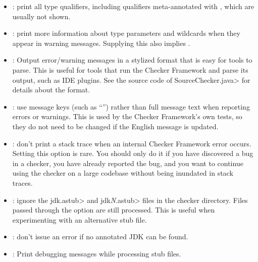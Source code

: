 \begin{itemize}
\item {}: print all type qualifiers, including
qualifiers meta-annotated with , which are
usually not shown.

\item {}: print more information about type
  parameters and wildcards when they appear in warning messages.  Supplying
  this also implies .

\item {}: Output error/warning messages in a
  stylized format that is easy for tools to parse.  This is useful for
  tools that run the Checker Framework and parse its output, such as IDE
  plugins.  See the source code of \<SourceChecker.java> for details about
  the format.

\item {}: use message keys (such as ``'')
rather than full message text when reporting errors or warnings.  This is
used by the Checker Framework's own tests, so they do not need to be
changed if the English message is updated.

\item {}: don't print a stack trace when an
internal Checker Framework error occurs.  Setting this option is rare.  You
should only do it if you have discovered a bug in a checker, you have
already reported the bug, and you want to continue using the checker on a
large codebase without being inundated in stack traces.

\end{itemize}


\begin{itemize}

\item {}:
  ignore the \<jdk.astub> and \<jdk\emph{N}.astub> files in the checker directory. Files passed
  through the  option are still processed. This is useful
  when experimenting with an alternative stub file.

\item {}:
  don't issue an error if no annotated JDK can be found.

\item {}:
  Print debugging messages while processing stub files.

\end{itemize}

